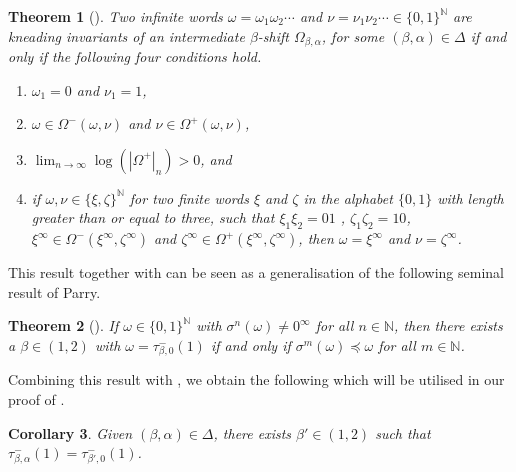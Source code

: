 \documentclass[a4paper,reqno,10pt]{amsart}
\newtheorem{theorem}{Theorem}[section]
\newtheorem{corollary}[theorem]{Corollary}
\begin{document}
    \begin{theorem}[{\cite{barnsley_steiner_vince_2014}}]\label{thm:BSV14}
        Two infinite words $\omega = \omega_{1}\omega_{2}\cdots$ and $\nu=\nu_{1}\nu_{2}\cdots \in \{0,1\}^\mathbb{N}$ are kneading invariants of an intermediate $\beta$-shift $\Omega_{\beta, \alpha}$, for some $(\beta, \alpha) \in \Delta$ if and only if the following four conditions hold.
            \begin{enumerate}[label={\rm(\arabic*)}]
                \item $\omega_1=0$ and $\nu_1=1$, 
                \item $\omega\in\Omega^-(\omega, \nu) $ and $\nu\in\Omega^+(\omega, \nu)$,
                \item $\lim_{n\to\infty} \log(|\Omega^+|_n)>0$, and
                \item if $\omega,\nu\in\{\xi,\zeta \}^\mathbb{N}$ for two finite words $\xi$ and $\zeta$ in the alphabet $\{0,1\}$ with length greater than or equal to three, such that $\xi_1\xi_2=01$ , $\zeta_1\zeta_2=10$, $\xi^\infty \in \Omega^-(\xi^\infty, \zeta^\infty)$ and $\zeta^\infty \in \Omega^{+}(\xi^\infty, \zeta^\infty)$, then $\omega=\xi^\infty$ and $\nu=\zeta^\infty$.
            \end{enumerate}
    \end{theorem}

This result together with  can be seen as a generalisation of the following seminal result of Parry.

    \begin{theorem}[{\cite[Corollary 1]{P1960}}]\label{thm:Parry_converse}
        If $\omega \in \{0, 1\}^{\mathbb{N}}$ with $\sigma^{n}(\omega) \neq 0^\infty$ for all $n \in \mathbb{N}$, then there exists a $\beta \in (1,2)$ with $\omega = \tau_{\beta, 0}^{-}(1)$ if and only if  $\sigma^{m}(\omega) \preceq \omega$ for all $m \in \mathbb{N}$.
    \end{theorem}

Combining this result with , we obtain the following which will be utilised in our proof of .

    \begin{corollary}\label{cor:From_greedy_to_intermediate}
        Given $(\beta, \alpha) \in \Delta$, there exists $\beta' \in (1,2)$ such that $\tau_{\beta,\alpha}^{-}(1) = \tau_{\beta',0}^{-}(1)$.
    \end{corollary}
\end{document}
